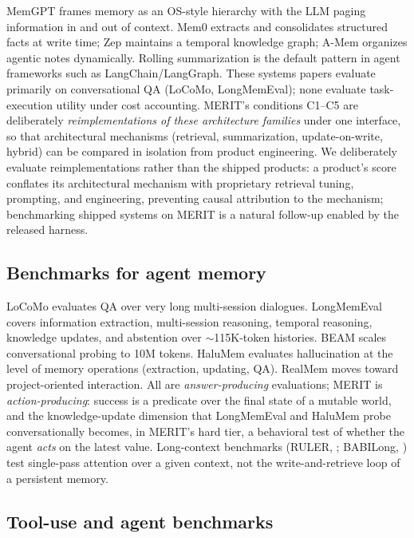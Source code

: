 \documentclass[11pt]{article}
\newcommand{\merit}{\textsc{MERIT}}
\begin{document}
MemGPT \citep{memgpt} frames memory as an OS-style hierarchy with the LLM
paging information in and out of context. Mem0 \citep{mem0} extracts and
consolidates structured facts at write time; Zep \citep{zep} maintains a
temporal knowledge graph; A-Mem \citep{amem} organizes agentic notes
dynamically. Rolling summarization is the default pattern in agent frameworks
such as LangChain/LangGraph. These systems papers evaluate primarily on
conversational QA (LoCoMo, LongMemEval); none evaluate task-execution utility
under cost accounting. \merit{}'s conditions C1--C5 are deliberately
\emph{reimplementations of these architecture families} under one interface,
so that architectural mechanisms (retrieval, summarization, update-on-write,
hybrid) can be compared in isolation from product engineering. We
deliberately evaluate reimplementations rather than the shipped products:
a product's score conflates its architectural mechanism with proprietary
retrieval tuning, prompting, and engineering, preventing causal
attribution to the mechanism; benchmarking shipped systems on \merit{} is
a natural follow-up enabled by the released harness.

\subsection{Benchmarks for agent memory}

LoCoMo \citep{locomo} evaluates QA over very long multi-session dialogues.
LongMemEval \citep{longmemeval} covers information extraction, multi-session
reasoning, temporal reasoning, knowledge updates, and abstention over
${\sim}$115K-token histories. BEAM \citep{beam} scales conversational probing
to 10M tokens. HaluMem \citep{halumem} evaluates hallucination at the level
of memory operations (extraction, updating, QA). RealMem \citep{realmem}
moves toward project-oriented interaction. All are \emph{answer-producing}
evaluations; \merit{} is \emph{action-producing}: success is a predicate over
the final state of a mutable world, and the knowledge-update dimension that
LongMemEval and HaluMem probe conversationally becomes, in \merit{}'s hard
tier, a behavioral test of whether the agent \emph{acts} on the latest value.
Long-context benchmarks (RULER, \citealp{ruler}; BABILong, \citealp{babilong})
test single-pass attention over a given context, not the write-and-retrieve
loop of a persistent memory.

\subsection{Tool-use and agent benchmarks}
\end{document}
